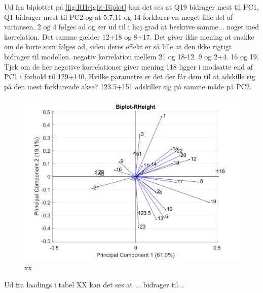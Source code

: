 Ud fra biplottet på \autoref{fig:RHeight-Biplot} kan det ses at Q19 bidrager mest til PC1, Q1 bidrager mest til PC2 og at 5,7,11 og 14 forklarer en meget lille del af variansen. 2 og 4 følges ad og ser ud til i høj grad at beskrive samme... noget med korrelation. Det samme gælder 12+18 og 8+17. Det giver ikke mening at snakke om de korte som følges ad, siden deres effekt er så lille at den ikke rigtigt bidrager til modellen. 
negativ korrelation mellem 21 og 18-12. 9 og 2+4. 16 og 19. Tjek om de her negative korrelationer giver mening
118 ligger i modsatte end af PC1 i forhold til 129+140. Hvilke parametre er det der får dem til at adskille sig på den mest forklarende akse? 123.5+151 adskiller sig på samme måde på PC2.
\begin{figure}[H]
\centering
\includegraphics[width=\textwidth]{Figure/DatabehandlingSkalaer/PCAfigures/RHeight-Biplot.png}
\caption{xx}
\label{fig:RHeight-Biplot}
\end{figure}
 Ud fra loadings i tabel XX kan det ses at ... bidrager til...
